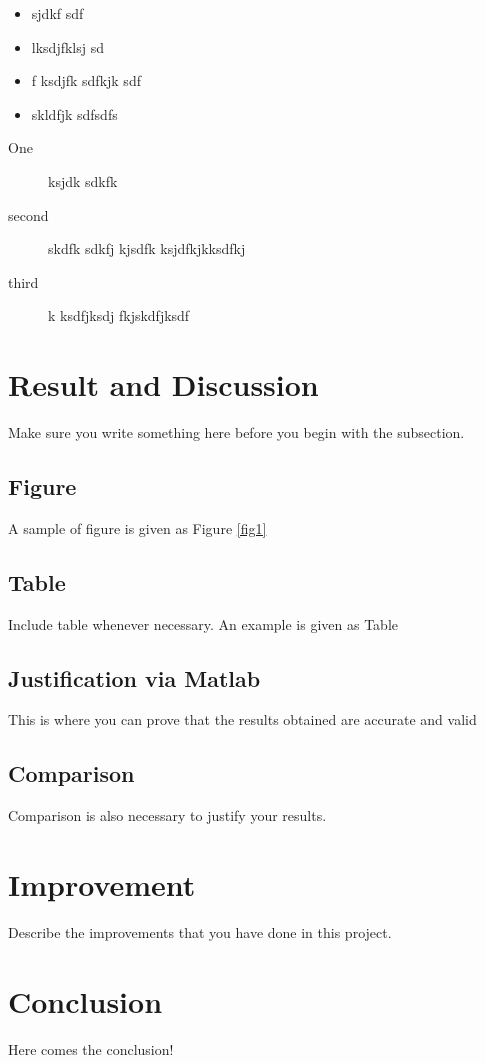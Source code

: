 \documentclass[12pt,a4paper]{report}
\begin{document}
\begin{itemize}
	\item sjdkf sdf
	\item lksdjfklsj sd
	\item f ksdjfk sdfkjk sdf
	\item skldfjk sdfsdfs
\end{itemize}

\begin{description}
	\item [One] ksjdk sdkfk
	\item [second] skdfk sdkfj kjsdfk ksjdfkjkksdfkj 
	\item [third] k ksdfjksdj fkjskdfjksdf
\end{description}

\chapter{Result and Discussion}
Make sure you write something here before you begin with the subsection. 

\section{Figure}
A sample of figure is given as Figure \ref{fig1}

\section{Table}
Include table whenever necessary.  An example is given as Table 

\section{Justification via Matlab}
This is where you can prove that the results obtained are accurate and valid

\section{Comparison}
Comparison is also necessary to justify your results.


\chapter{Improvement}
Describe the improvements that you have done in this project.

\chapter{Conclusion}
Here comes the conclusion!
\end{document}
